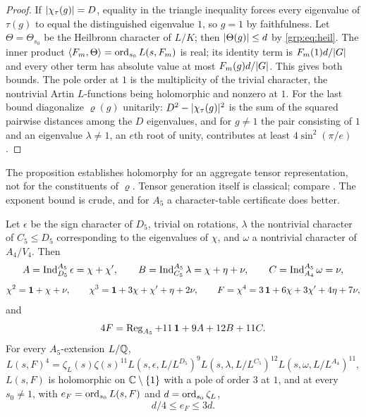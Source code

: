 \begin{proof}
If $\lvert\chi_\tau(g)\rvert=D$, equality in the triangle inequality forces every
eigenvalue of $\tau(g)$ to equal the distinguished eigenvalue $1$, so $g=1$ by
faithfulness. Let $\Theta=\Theta_{s_0}$ be the Heilbronn character of $L/K$;
then $\lvert\Theta(g)\rvert\le d$ by \eqref{grp:eq:heil}. The inner product
$\langle F_m,\Theta\rangle=\operatorname{ord}_{s_0}L(s,F_m)$ is real; its identity term is
$F_m(1)d/\lvert G\rvert$ and every other term has absolute value at most
$F_m(g)d/\lvert G\rvert$. This gives both bounds. The pole order at $1$ is the
multiplicity of the trivial character, the nontrivial Artin $L$-functions
being holomorphic and nonzero at $1$. For the last bound diagonalize
$\varrho(g)$ unitarily: $D^2-\lvert\chi_\tau(g)\rvert^2$ is the sum of the squared
pairwise distances among the $D$ eigenvalues, and for $g\ne1$ the pair
consisting of $1$ and an eigenvalue $\lambda\ne1$, an $e$th root of unity,
contributes at least $4\sin^2(\pi/e)$.
\end{proof}

The proposition establishes holomorphy for an aggregate tensor representation,
not for the constituents of $\varrho$. Tensor generation itself is classical;
compare \cite{Steinberg2014Burnside}. The exponent bound is crude, and for
$A_5$ a character-table certificate does better.

\begin{theorem}\label{grp:thm:a5-tensor}
Let $\epsilon$ be the sign character of $D_5$, trivial on rotations, $\lambda$
the nontrivial character of $C_5\le D_5$ corresponding to the eigenvalues of
$\chi$, and $\omega$ a nontrivial character of $A_4/V_4$. Then
\[
 A=\operatorname{Ind}_{D_5}^{A_5}\epsilon=\chi+\chi',\qquad
 B=\operatorname{Ind}_{C_5}^{A_5}\lambda=\chi+\eta+\nu,\qquad
 C=\operatorname{Ind}_{A_4}^{A_5}\omega=\nu,
\]
\[
 \chi^2=\mathbf{1}+\chi+\nu,\qquad
 \chi^3=\mathbf{1}+3\chi+\chi'+\eta+2\nu,\qquad
 F=\chi^4=3\,\mathbf{1}+6\chi+3\chi'+4\eta+7\nu,
\]
and
\begin{equation}\label{grp:eq:a5-fourth}
 4F=\operatorname{Reg}_{A_5}+11\,\mathbf{1}+9A+12B+11C .
\end{equation}
For every $A_5$-extension $L/\mathbb{Q}$,
\begin{equation}\label{grp:eq:a5-product}
 L(s,F)^4=\zeta_L(s)\zeta(s)^{11}
 L(s,\epsilon,L/L^{D_5})^9L(s,\lambda,L/L^{C_5})^{12}L(s,\omega,L/L^{A_4})^{11},
\end{equation}
$L(s,F)$ is holomorphic on $\mathbb{C}\setminus\{1\}$ with a pole of order $3$ at $1$,
and at every $s_0\ne1$, with $e_F=\operatorname{ord}_{s_0}L(s,F)$ and $d=\operatorname{ord}_{s_0}\zeta_L$,
\begin{equation}\label{grp:eq:a5-mult}
 d/4\le e_F\le3d .
\end{equation}
\end{theorem}

